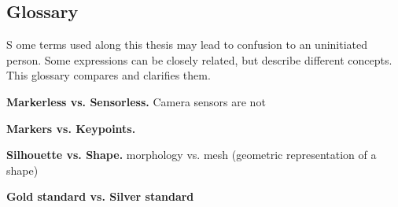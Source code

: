 
{} \mtcaddchapter
\label{Ann:gloss}

\vspace*{-1.6cm}
\begin{flushright}
\section*{\fontsize{20pt}{20pt}\selectfont\textnormal{Glossary}}
\end{flushright}
\vspace{-0.2cm}


\chead[\fancyplain{}{}]
      {\fancyplain{}{}}
\lfoot[\fancyplain{}{}]
      {\fancyplain{}{}}
\cfoot[\fancyplain{}{\thepage}]
      {\fancyplain{}{\thepage}}
\rfoot[\fancyplain{}{}]%
     {\fancyplain{}{\scriptsize}}


\lettrine[lines=1]{S}{ }ome terms used along this thesis may lead to confusion to an uninitiated person. Some expressions can be closely related, but describe different concepts. This glossary compares and clarifies them.

\vspace*{1cm}

\noindent\textbf{Markerless vs. Sensorless. }
Camera sensors are not 


\vspace*{0.5cm}

\noindent\textbf{Markers vs. Keypoints. }

\vspace*{0.5cm}

\noindent\textbf{Silhouette vs. Shape. }
morphology
vs. mesh (geometric representation of a shape)

\vspace*{0.5cm}

\noindent\textbf{Gold standard vs. Silver standard}

